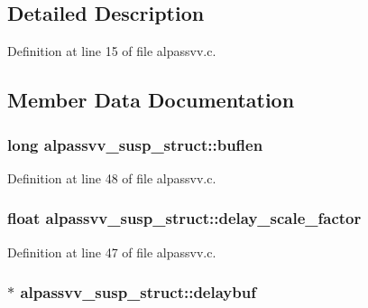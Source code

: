 \subsection{Detailed Description}


Definition at line 15 of file alpassvv.\+c.



\subsection{Member Data Documentation}
\subsubsection[{\texorpdfstring{buflen}{buflen}}]{\setlength{\rightskip}{0pt plus 5cm}long alpassvv\+\_\+susp\+\_\+struct\+::buflen}\hypertarget{structalpassvv__susp__struct_a8accb8e7e5e8355ec1dff41ecd229cc0}{}\label{structalpassvv__susp__struct_a8accb8e7e5e8355ec1dff41ecd229cc0}


Definition at line 48 of file alpassvv.\+c.

\subsubsection[{\texorpdfstring{delay\+\_\+scale\+\_\+factor}{delay_scale_factor}}]{\setlength{\rightskip}{0pt plus 5cm}float alpassvv\+\_\+susp\+\_\+struct\+::delay\+\_\+scale\+\_\+factor}\hypertarget{structalpassvv__susp__struct_a9339e326516a6dfc33b9433607c707e2}{}\label{structalpassvv__susp__struct_a9339e326516a6dfc33b9433607c707e2}


Definition at line 47 of file alpassvv.\+c.

\subsubsection[{\texorpdfstring{delaybuf}{delaybuf}}]{$\ast$ alpassvv\+\_\+susp\+\_\+struct\+::delaybuf}\hypertarget{structalpassvv__susp__struct_a52f7c533a1d2c6b2504ae93882a18d5d}{}\label{structalpassvv__susp__struct_a52f7c533a1d2c6b2504ae93882a18d5d}


